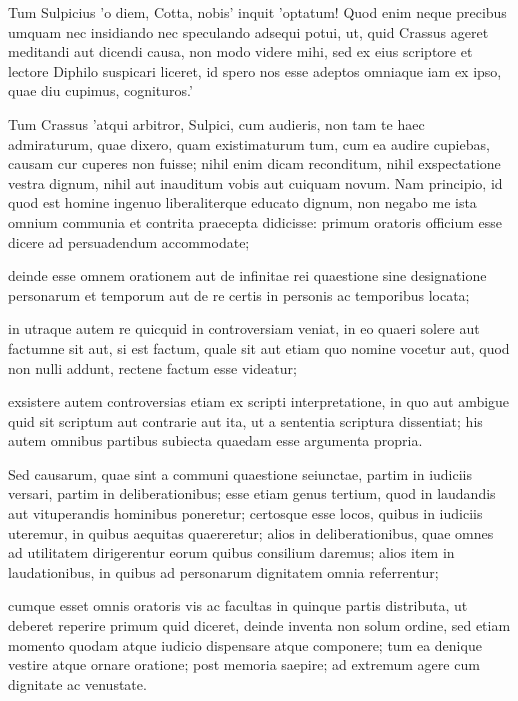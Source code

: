  Tum Sulpicius 'o diem, Cotta, nobis' inquit 'optatum! Quod enim neque precibus umquam nec insidiando nec speculando adsequi potui, ut, quid Crassus ageret meditandi aut dicendi causa, non modo videre mihi, sed ex eius scriptore et lectore Diphilo suspicari liceret, id spero nos esse adeptos omniaque iam ex ipso, quae diu cupimus, cognituros.'

 Tum Crassus 'atqui arbitror, Sulpici, cum audieris, non tam te haec admiraturum, quae dixero, quam existimaturum tum, cum ea audire cupiebas, causam cur cuperes non fuisse; nihil enim dicam reconditum, nihil exspectatione vestra dignum, nihil aut inauditum vobis aut cuiquam novum. Nam principio, id quod est homine ingenuo liberaliterque educato dignum, non negabo me ista omnium communia et contrita praecepta didicisse: primum oratoris officium esse dicere ad persuadendum accommodate;

 deinde esse omnem orationem aut de infinitae rei quaestione sine designatione personarum et temporum aut de re certis in personis ac temporibus locata;

 in utraque autem re quicquid in controversiam veniat, in eo quaeri solere aut factumne sit aut, si est factum, quale sit aut etiam quo nomine vocetur aut, quod non nulli addunt, rectene factum esse videatur;

 exsistere autem controversias etiam ex scripti interpretatione, in quo aut ambigue quid sit scriptum aut contrarie aut ita, ut a sententia scriptura dissentiat; his autem omnibus partibus subiecta quaedam esse argumenta propria.

 Sed causarum, quae sint a communi quaestione seiunctae, partim in iudiciis versari, partim in deliberationibus; esse etiam genus tertium, quod in laudandis aut vituperandis hominibus poneretur; certosque esse locos, quibus in iudiciis uteremur, in quibus aequitas quaereretur; alios in deliberationibus, quae omnes ad utilitatem dirigerentur eorum quibus consilium daremus; alios item in laudationibus, in quibus ad personarum dignitatem omnia referrentur;

 cumque esset omnis oratoris vis ac facultas in quinque partis distributa, ut deberet reperire primum quid diceret, deinde inventa non solum ordine, sed etiam momento quodam atque iudicio dispensare atque componere; tum ea denique vestire atque ornare oratione; post memoria saepire; ad extremum agere cum dignitate ac venustate.

